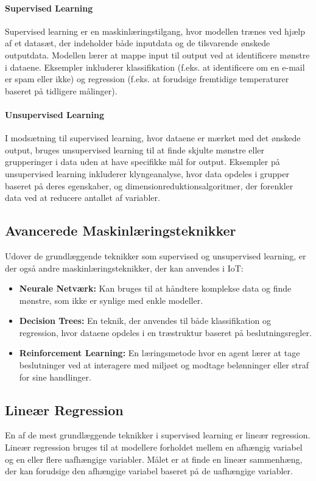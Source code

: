 \paragraph{Supervised Learning}
Supervised learning er en maskinlæringstilgang, hvor modellen trænes ved hjælp af et datasæt, der indeholder både inputdata og de tilsvarende ønskede outputdata. Modellen lærer at mappe input til output ved at identificere mønstre i dataene. Eksempler inkluderer klassifikation (f.eks. at identificere om en e-mail er spam eller ikke) og regression (f.eks. at forudsige fremtidige temperaturer baseret på tidligere målinger).

\paragraph{Unsupervised Learning}
I modsætning til supervised learning, hvor dataene er mærket med det ønskede output, bruges unsupervised learning til at finde skjulte mønstre eller grupperinger i data uden at have specifikke mål for output. Eksempler på unsupervised learning inkluderer klyngeanalyse, hvor data opdeles i grupper baseret på deres egenskaber, og dimensionreduktionsalgoritmer, der forenkler data ved at reducere antallet af variabler.

\subsection{Avancerede Maskinlæringsteknikker}
Udover de grundlæggende teknikker som supervised og unsupervised learning, er der også andre maskinlæringsteknikker, der kan anvendes i IoT:
\begin{itemize}
	\item \textbf{Neurale Netværk:} Kan bruges til at håndtere komplekse data og finde mønstre, som ikke er synlige med enkle modeller.
	\item \textbf{Decision Trees:} En teknik, der anvendes til både klassifikation og regression, hvor dataene opdeles i en træstruktur baseret på beslutningsregler.
	\item \textbf{Reinforcement Learning:} En læringsmetode hvor en agent lærer at tage beslutninger ved at interagere med miljøet og modtage belønninger eller straf for sine handlinger.
\end{itemize}

\subsection{Lineær Regression}
En af de mest grundlæggende teknikker i supervised learning er lineær regression. Lineær regression bruges til at modellere forholdet mellem en afhængig variabel og en eller flere uafhængige variabler. Målet er at finde en lineær sammenhæng, der kan forudsige den afhængige variabel baseret på de uafhængige variabler.


